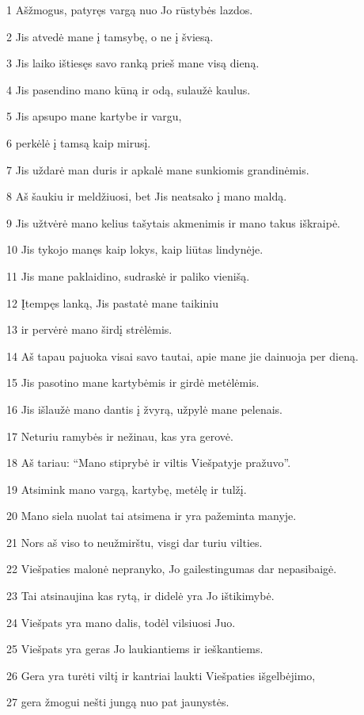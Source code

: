 \par 1 Aš­žmogus, patyręs vargą nuo Jo rūstybės lazdos. 
\par 2 Jis atvedė mane į tamsybę, o ne į šviesą. 
\par 3 Jis laiko ištiesęs savo ranką prieš mane visą dieną. 
\par 4 Jis pasendino mano kūną ir odą, sulaužė kaulus. 
\par 5 Jis apsupo mane kartybe ir vargu, 
\par 6 perkėlė į tamsą kaip mirusį. 
\par 7 Jis uždarė man duris ir apkalė mane sunkiomis grandinėmis. 
\par 8 Aš šaukiu ir meldžiuosi, bet Jis neatsako į mano maldą. 
\par 9 Jis užtvėrė mano kelius tašytais akmenimis ir mano takus iškraipė. 
\par 10 Jis tykojo manęs kaip lokys, kaip liūtas lindynėje. 
\par 11 Jis mane paklaidino, sudraskė ir paliko vienišą. 
\par 12 Įtempęs lanką, Jis pastatė mane taikiniu 
\par 13 ir pervėrė mano širdį strėlėmis. 
\par 14 Aš tapau pajuoka visai savo tautai, apie mane jie dainuoja per dieną. 
\par 15 Jis pasotino mane kartybėmis ir girdė metėlėmis. 
\par 16 Jis išlaužė mano dantis į žvyrą, užpylė mane pelenais. 
\par 17 Neturiu ramybės ir nežinau, kas yra gerovė. 
\par 18 Aš tariau: “Mano stiprybė ir viltis Viešpatyje pražuvo”. 
\par 19 Atsimink mano vargą, kartybę, metėlę ir tulžį. 
\par 20 Mano siela nuolat tai atsimena ir yra pažeminta manyje. 
\par 21 Nors aš viso to neužmirštu, visgi dar turiu vilties. 
\par 22 Viešpaties malonė nepranyko, Jo gailestingumas dar nepasibaigė. 
\par 23 Tai atsinaujina kas rytą, ir didelė yra Jo ištikimybė. 
\par 24 Viešpats yra mano dalis, todėl vilsiuosi Juo. 
\par 25 Viešpats yra geras Jo laukiantiems ir ieškantiems. 
\par 26 Gera yra turėti viltį ir kantriai laukti Viešpaties išgelbėjimo, 
\par 27 gera žmogui nešti jungą nuo pat jaunystės. 
